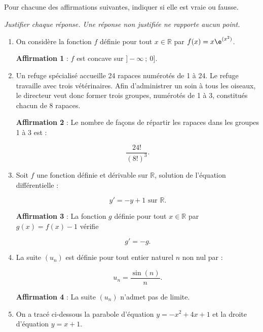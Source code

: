 Pour chacune des affirmations suivantes, indiquer si elle est vraie ou fausse.

\emph{Justifier chaque réponse. Une réponse non justifiée ne rapporte aucun point.}

\medskip

\begin{enumerate}
\item On considère la fonction $f$ définie pour tout $x \in \mathbb{R}$ par $f(x) = x \e^{(x^2)}$.

\textbf{Affirmation 1} : $f$ est concave sur $]-\infty~;~0]$.

\item Un refuge spécialisé accueille 24 rapaces numérotés de 1 à 24. Le refuge travaille avec trois vétérinaires. Afin d'administrer un soin à tous les oiseaux, le directeur veut donc former trois groupes, numérotés de 1 à 3, constitués chacun de 8 rapaces.

\textbf{Affirmation 2} : Le nombre de façons de répartir les rapaces dans les groupes 1 à 3 est :

\[\frac{24!}{(8!)^3}.\]

\item Soit $f$ une fonction définie et dérivable sur $\mathbb{R}$, solution de l'équation différentielle :

\[y' = -y + 1 \text{ sur } \mathbb{R}.\]

\textbf{Affirmation 3} : La fonction $g$ définie pour tout $x \in \mathbb{R}$ par $g(x) = f(x) - 1$ vérifie

\[g' = -g.\]

\item La suite $(u_n)$ est définie pour tout entier naturel $n$ non nul par :

\[u_n = \frac{\sin(n)}{n}.\]

\textbf{Affirmation 4} : La suite $(u_n)$ n'admet pas de limite.

\item On a tracé ci-dessous la parabole d'équation $y = -x^2 + 4x + 1$ et la droite d'équation $y = x + 1$.

\begin{center}



















\end{center}
\end{enumerate}

